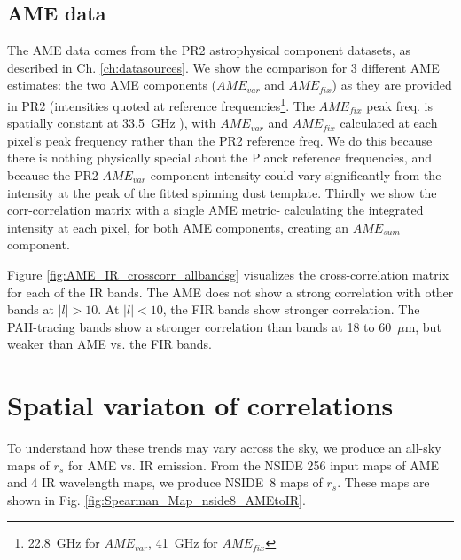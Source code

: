     \subsection{AME data}
       The AME data comes from the PR2 astrophysical component datasets, as described in Ch. \ref{ch:datasources}. We show the comparison for 3 different AME estimates: the two AME components ($AME_{var}$ and $AME_{fix}$) as they are provided in PR2 (intensities quoted at reference frequencies\footnote{22.8~GHz for $AME_{var}$, 41~GHz for $AME_{fix}$}. The  $AME_{fix}$ peak freq. is spatially constant at 33.5~GHz ), with $AME_{var}$ and $AME_{fix}$ calculated at each pixel's peak frequency rather than the PR2 reference freq. We do this because there is nothing physically special about the Planck reference frequencies, and because the PR2 $AME_{var}$ component intensity could vary significantly from the intensity at the peak of the fitted spinning dust template. Thirdly we show the corr-correlation matrix with a single AME metric- calculating the integrated intensity at each pixel, for both AME components, creating an $AME_{sum}$ component.



     Figure \ref{fig:AME_IR_crosscorr_allbandsg} visualizes the cross-correlation matrix for each of the IR bands. The AME does not show a strong correlation with other bands at $|l|>10$. At $|l|<10$, the FIR bands show stronger correlation. The PAH-tracing bands show a stronger correlation than bands at 18 to 60~$\mu$m, but weaker than AME vs. the FIR bands.

  \section{Spatial variaton of correlations}
    To understand how these trends may vary across the sky, we produce an all-sky maps of $r_{s}$ for AME vs. IR emission. From the NSIDE 256 input maps of AME and 4 IR wavelength maps, we produce NSIDE~8 maps of $r_{s}$. These maps are shown in Fig. \hyperref[fig:Spearman_Map_nside8_AMEtoIR]{\ref*{fig:Spearman_Map_nside8_AMEtoIR}}.

